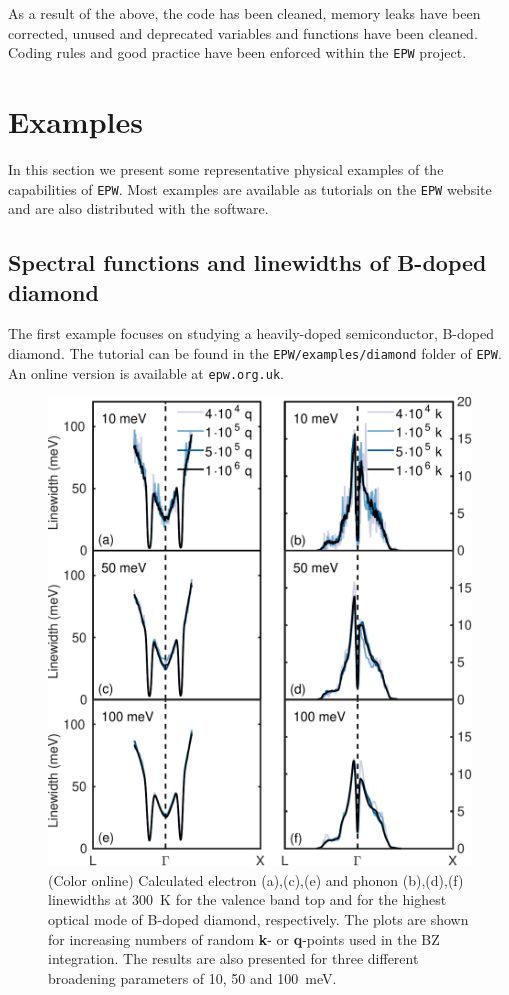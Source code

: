 \documentclass[final,3p,times,twocolumn]{elsarticle}
\begin{document}
As a result of the above, the code has been cleaned, memory leaks have been corrected, unused and deprecated variables and functions have been cleaned.  
Coding rules and good practice have been enforced within the \texttt{EPW} project. 

      
\section{Examples}
\label{examplessection}

In this section we present some representative physical examples of the capabilities of \texttt{EPW}. Most examples are available as tutorials on the \texttt{EPW} website and are also distributed with the software. 

\subsection{Spectral functions and linewidths of B-doped diamond}

The first example focuses on studying a heavily-doped semiconductor, B-doped diamond. The tutorial can be found in the \texttt{EPW/examples/diamond} folder of \texttt{EPW}. An online version is available at \texttt{epw.org.uk}. 

\begin{figure}[b!]
  \centering
  \includegraphics[width=0.95\linewidth]{C_linewidths2.pdf}
  \caption{\label{C-linewidths}(Color online) Calculated electron (a),(c),(e) and phonon (b),(d),(f) linewidths at 300~K for the valence band top and for the highest optical mode of B-doped diamond, respectively. The plots are shown for increasing numbers of random \textbf{k}- or \textbf{q}-points used in the BZ integration. The results are also presented for three different broadening parameters of 10, 50 and 100~meV.}
\end{figure}
\end{document}
